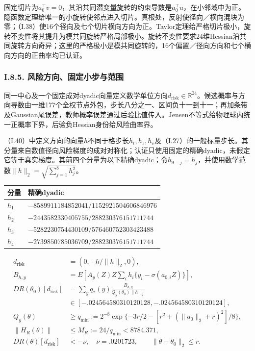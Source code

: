 \documentclass[11pt,a4paper]{article}
\begin{document}
固定切片为\(a_0^\top v=0\)，其沿共同潜变量旋转的约束导数是\(a_0^\top u\)，在小邻域中为正。隐函数定理给唯一的小旋转使邻点进入切片。真根处，反射使径向／横向混块为零；（I.38）使16个径向及七个切片横向方向为正。Taylor定理给严格切片极小，旋转不变性将其提升为模共同旋转严格局部极小。旋转不变性要求24维Hessian沿共同旋转方向奇异；这里的严格极小是模共同旋转的，16个偏置／径向方向和七个横向方向的正曲率均已认证。

\subsubsection*{I.8.5.
风险方向、固定小步与范围}\label{i.8.5.-ux98ceux9669ux65b9ux5411ux56faux5b9aux5c0fux6b65ux4e0eux8303ux56f4}

同一中心及一个固定成对dyadic向量定义数学单位方向\(d_{\mathrm{risk}}\in\mathbb R^{24}\)。候选概率与方向导数由一维177个全权节点外包，步长八分之一、区间负十一到十一；再加条带及Gaussian尾误差，教师概率误差通过后验比值传入。Jensen不等式给物理球内统一正概率下界，后验负Hessian身份给风险曲率界。

（I.40）中定义方向的向量\(h\)不同于格步长\(h_t,h_z,h_v\)及（I.27）的一般标量步长。其分量来自数值径向风险梯度的成对对称化；认证只使用固定的精确dyadic，未假定它等于真实梯度。其前四个分量为以下精确dyadic；令\(h_{9-j}=h_j\)，并使用数学范数\(\|h\|_2=\sqrt{\sum_{j=1}^8h_j^2}\)。

\begin{longtable}[]{@{}ll@{}}
\toprule\noalign{}
分量 & 精确dyadic \\
\midrule\noalign{}
\endhead
\bottomrule\noalign{}
\endlastfoot
\(h_1\) & \(-8589911184852041/1152921504606846976\) \\
\(h_2\) & \(-2443582330405755/288230376151711744\) \\
\(h_3\) & \(-5282230754430109/576460752303423488\) \\
\(h_4\) & \(-2739850785036709/288230376151711744\) \\
\end{longtable}

\[
\begin{aligned}
d_{\mathrm{risk}}&=(0,-h/\|h\|_2,0),\\
B_{h,y}&=E[A_y(Z)Z\sum_i h_i\{y_i-\sigma(a_{0,i}Z)\}],\\
DR(\theta_0)[d_{\mathrm{risk}}]&=\sum_yq_*(y)\frac{B_{h,y}}{Q_y(\theta_0)\|h\|_2}\\
&\in[-.024564580310120128,-.024564580310120124],\\
Q_y(\theta)&\ge q_{\min}:=2^{-8}
\exp\{-3r/2-[r^2+(\|a_0\|_2+r)^2]/8\},\\
\|H_R(\theta)\|&\le M_R:=24/q_{\min}<8784.371,\\
DR(\theta)[d_{\mathrm{risk}}]&<-\nu,\quad\nu=.0201723,\qquad\|\theta-\theta_0\|_2\le r.
\end{aligned}
\tag{I.40}
\]
\end{document}

